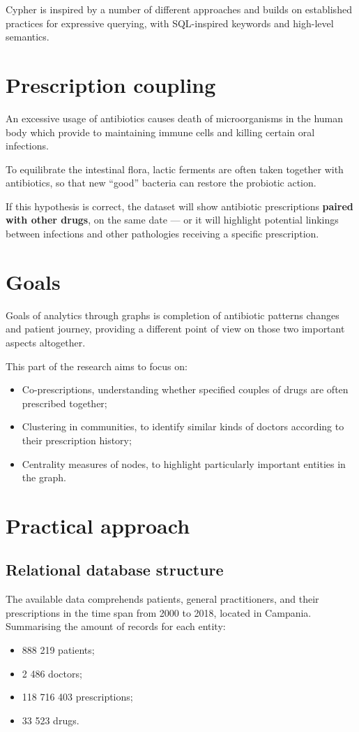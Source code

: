 Cypher is inspired by a number of different approaches and builds on established practices for expressive querying, with SQL-inspired keywords and high-level semantics\cite{neo4jbook}.

\section{Prescription coupling}
An excessive usage of antibiotics causes death of microorganisms in the human body which provide to maintaining immune cells and killing certain oral infections\cite{bacteria}.

To equilibrate the intestinal flora, lactic ferments are often taken together with antibiotics, so that new ``good'' bacteria can restore the probiotic action.

If this hypothesis is correct, the dataset will show antibiotic prescriptions \textbf{paired with other drugs}, on the same date --- or it will highlight potential linkings between infections and other pathologies receiving a specific prescription.

\section{Goals}
Goals of analytics through graphs is completion of antibiotic patterns changes and patient journey, providing a different point of view on those two important aspects altogether.

This part of the research aims to focus on:
\begin{itemize}
	\item Co-prescriptions, understanding whether specified couples of drugs are often prescribed together;
	\item Clustering in communities, to identify similar kinds of doctors according to their prescription history;
	\item Centrality measures of nodes, to highlight particularly important entities in the graph.
\end{itemize}

\section{Practical approach}

\subsection{Relational database structure}
The available data comprehends patients, general practitioners, and their prescriptions in the time span from 2000 to 2018, located in Campania. Summarising the amount of records for each entity:
\begin{itemize}
	\item 888 219 patients;
	\item 2 486 doctors;
	\item 118 716 403 prescriptions;
	\item 33 523 drugs.
\end{itemize}

